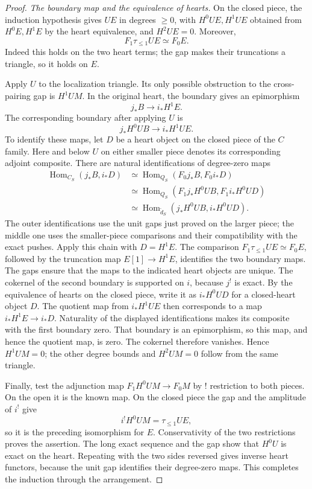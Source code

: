 \documentclass[11pt]{article}
\numberwithin{equation}{section}
\theoremstyle{definition}
\theoremstyle{remark}
\begin{document}
\begin{proof}
\smallskip
\noindent\emph{The boundary map and the equivalence of hearts.}
On the closed piece, the induction hypothesis gives $UE$ in
degrees $\ge0$, with $H^0UE,H^1UE$ obtained from $H^0E,H^1E$
by the heart equivalence, and $H^2UE=0$.  Moreover,
\[
                        F_1\tau_{\le1}UE\simeq F_0E.
\]
Indeed this holds on the two heart terms; the gap makes their
truncations a triangle, so it holds on $E$.

Apply $U$ to the localization triangle.  Its only possible
obstruction to the cross-pairing gap is $H^1UM$.  In the original heart,
the boundary gives an epimorphism
\[
                    j_*B\longrightarrow i_*H^1E.
\]
The corresponding boundary after applying $U$ is
\[
                j_*H^0UB\longrightarrow i_*H^1UE.
\]
To identify these maps, let $D$ be a heart object on the closed
piece of the $C$ family.  Here and below $U$ on either smaller
piece denotes its corresponding adjoint composite.  There are
natural identifications of degree-zero maps
\[
\begin{aligned}
 \operatorname{Hom}_{C_S}(j_*B,i_*D)
 &\simeq \operatorname{Hom}_{Q_S}(F_0j_*B,F_0i_*D)\\
 &\simeq \operatorname{Hom}_{Q_S}
       (F_1j_*H^0UB,F_1i_*H^0UD)\\
 &\simeq \operatorname{Hom}_{\check d_S}
       (j_*H^0UB,i_*H^0UD).
\end{aligned}
\]
The outer identifications use the unit gaps just proved on the
larger piece; the middle one uses the smaller-piece comparisons
and their compatibility with the exact pushes.  Apply this chain
with $D=H^1E$.  The comparison
$F_1\tau_{\le1}UE\simeq F_0E$, followed by the truncation map
$E[1]\to H^1E$, identifies the two boundary maps.  The gaps
ensure that the maps to the indicated heart objects are unique.
The cokernel of the second boundary is supported on $i$, because
$j^!$ is exact.  By the equivalence of hearts on the closed piece,
write it as $i_*H^0UD$ for a closed-heart object $D$.  The quotient
map from $i_*H^1UE$ then corresponds to a map
$i_*H^1E\to i_*D$.  Naturality of the displayed identifications
makes its composite with the first boundary zero.  That boundary
is an epimorphism, so this map, and hence the quotient map, is zero.
The cokernel therefore vanishes.  Hence
$H^1UM=0$; the other degree bounds and $H^2UM=0$ follow from
the same triangle.

Finally, test the adjunction map $F_1H^0UM\to F_0M$ by !
restriction to both pieces.  On the open it is the known map.
On the closed piece the gap and the amplitude of $i^!$ give
\[
                         i^!H^0UM=\tau_{\le1}UE,
\]
so it is the preceding isomorphism for $E$.  Conservativity of
the two restrictions proves the assertion.  The long exact
sequence and the gap show that $H^0U$ is exact on the heart.
Repeating with the two sides reversed gives inverse heart
functors, because the unit gap identifies their degree-zero
maps.  This completes the induction through the arrangement.


\end{proof}
\end{document}
